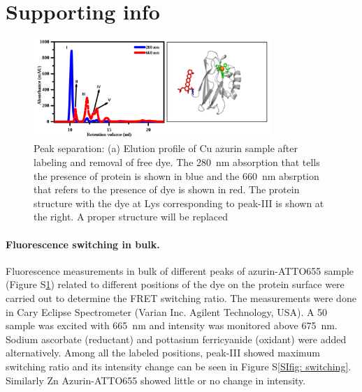 \graphicspath{{chapters/c4_azurin_sm/si/}}
\section{Supporting info}
\begin{figure}[ht]
  \centering
  \includegraphics[width=0.8\textwidth]{peak_separation}
  \makeatletter
  \renewcommand{\fnum@figure}{\figurename~S\thefigure}
  \makeatother
  \caption{Peak separation: (a) Elution profile of Cu azurin sample after labeling and removal of free dye.
  The \SI{280}{\nm} absorption that tells the presence of protein is shown in blue and the \SI{660}{\nm} absrption that refers to the presence of dye is shown in red.
  The protein structure with the dye at Lys corresponding to peak-III is shown at the right. 
  {A proper structure will be replaced}}
  \label{SIfig: peak_sep}
\end{figure}
\paragraph*{Fluorescence switching in bulk.} Fluorescence measurements in bulk of different peaks of azurin-ATTO655 sample (Figure S\ref{SIfig: peak_sep}) related to different positions of the dye on the protein surface were carried out to determine the FRET switching ratio.
The measurements were done in Cary Eclipse Spectrometer (Varian Inc. Agilent Technology, USA).
A \SI{50}{\nM} sample was excited with \SI{665}{\nm} and intensity was monitored above \SI{675}{\nm}.
Sodium ascorbate (reductant) and pottasium ferricyanide (oxidant) were added alternatively.
Among all the labeled positions, peak-III showed maximum switching ratio and its intensity change can be seen in Figure S\ref{SIfig: switching}.
Similarly Zn Azurin-ATTO655 showed little or no change in intensity.


